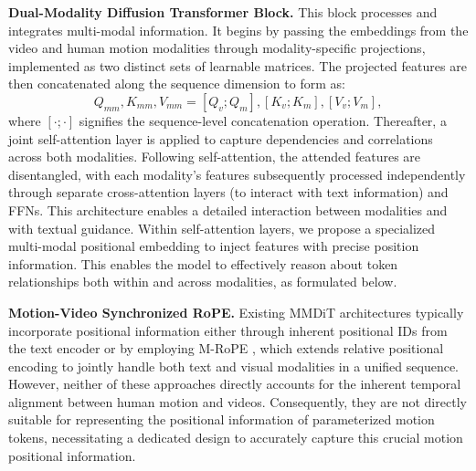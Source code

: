 \textbf{Dual-Modality Diffusion Transformer Block.}
This block processes and integrates multi-modal information. It begins by passing the embeddings from the video and human motion modalities through modality-specific projections, implemented as two distinct sets of learnable matrices. The projected features are then concatenated along the sequence dimension to form as:
\begin{equation}\label{concat}
Q_{mm},K_{mm},V_{mm} = [Q_v; Q_m],[K_v; K_m],[V_v; V_m],
\end{equation}
where $[\cdot;\cdot]$ signifies the sequence-level concatenation operation.  Thereafter, a joint self-attention layer is applied to capture dependencies and correlations across both modalities.
Following self-attention, the attended features are disentangled, with each modality's features subsequently processed independently through separate cross-attention layers (to interact with text information) and FFNs. This architecture enables a detailed interaction between modalities and with textual guidance. 
Within self-attention layers, we propose a specialized multi-modal positional embedding to inject features with precise position information. This enables the model to effectively reason about token relationships both within and across modalities, as formulated below.


\textbf{Motion-Video Synchronized RoPE.} Existing MMDiT \citep{esser2024scaling, kong2024hunyuanvideo} architectures typically incorporate positional information either through inherent positional IDs from the text encoder or by employing M-RoPE \citep{wang2024qwen2}, which extends relative positional encoding to jointly handle both text and visual modalities in a unified sequence. However, neither of these approaches directly accounts for the inherent temporal alignment between human motion and videos. Consequently, they are not directly suitable for representing the positional information of parameterized motion tokens, necessitating a dedicated design to accurately capture this crucial motion positional information.



